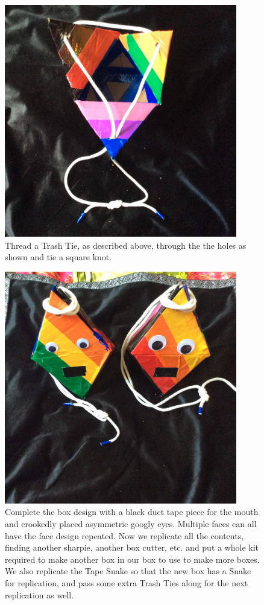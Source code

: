 \begin{figure}
	\centering
	\includegraphics[width=4in]{figures/trashrobot/artboxtie.jpg}
	\caption[artboxtie]
	{Thread a Trash Tie, as described above, through the the holes as shown and tie a square knot.}
\end{figure}

\begin{figure}
	\centering
	\includegraphics[width=4in]{figures/trashrobot/artboxcopy.jpg}
	\caption[artboxcopy]
	{Complete the box design with a black duct tape piece for the mouth and crookedly placed asymmetric googly eyes.  Multiple faces can all have the face design repeated.  Now we replicate all the contents, finding another sharpie, another box cutter, etc. and put a whole kit required to make another box in our box to use to make more boxes.  We also replicate the Tape Snake so that the new box has a Snake for replication, and pass some extra Trash Ties along for the next replication as well.}
\end{figure}

